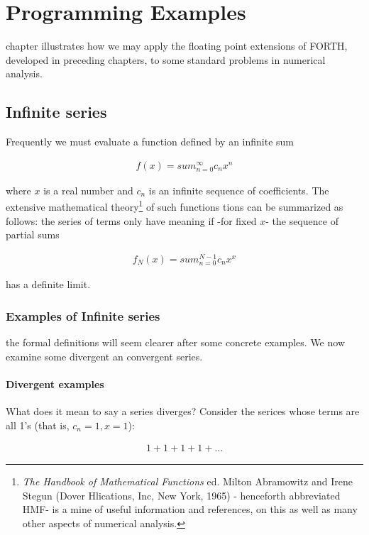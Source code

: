 \chapter{Programming Examples}
\startcontents[chapters]

 chapter illustrates how we may apply the floating point extensions of FORTH, developed in preceding chapters, to some standard problems in numerical analysis.

\section{Infinite series}

Frequently we must evaluate a function defined by an infinite sum

\begin{align}
    f(x) = sum_{n=0}^{\infty}c_{n}x^{n}
\end{align}

where $x$ is a real number and $c_n$ is an infinite sequence of coefficients. The extensive mathematical theory\footnote{\textit{The Handbook of Mathematical Functions} ed. Milton Abramowitz and Irene Stegun (Dover Hlications, Inc, New York, 1965) - henceforth abbreviated HMF- is a mine of useful information and references, on this as well as many other aspects of numerical analysis.} of such functions tions can be summarized as follows: the series of terms only have meaning if -for fixed $x$- the sequence of partial sums

\begin{align}
    f_{N}(x) = sum_{n=0}^{N-1}c_{n}x^{x}
\end{align}

has a definite limit.

\subsection{Examples of Infinite series}
 the formal definitions will seem clearer after some concrete examples. We now examine some divergent an convergent series.

\subsubsection{Divergent examples}
What does it mean to say a series diverges? Consider the serices whose terms are all 1's (that is, $c_n = 1, x = 1$):

\begin{align}
    1 + 1 + 1 + 1 + ...
\end{align}

